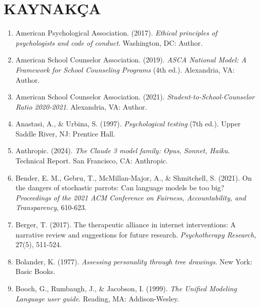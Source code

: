 
\chapter*{KAYNAKÇA}

\begin{enumerate}


\item American Psychological Association. (2017). \textit{Ethical principles of psychologists and code of conduct}. Washington, DC: Author.

\item American School Counselor Association. (2019). \textit{ASCA National Model: A Framework for School Counseling Programs} (4th ed.). Alexandria, VA: Author.

\item American School Counselor Association. (2021). \textit{Student-to-School-Counselor Ratio 2020-2021}. Alexandria, VA: Author.

\item Anastasi, A., \& Urbina, S. (1997). \textit{Psychological testing} (7th ed.). Upper Saddle River, NJ: Prentice Hall.

\item Anthropic. (2024). \textit{The Claude 3 model family: Opus, Sonnet, Haiku}. Technical Report. San Francisco, CA: Anthropic.

\item Bender, E. M., Gebru, T., McMillan-Major, A., \& Shmitchell, S. (2021). On the dangers of stochastic parrots: Can language models be too big? \textit{Proceedings of the 2021 ACM Conference on Fairness, Accountability, and Transparency}, 610-623.

\item Berger, T. (2017). The therapeutic alliance in internet interventions: A narrative review and suggestions for future research. \textit{Psychotherapy Research}, 27(5), 511-524.

\item Bolander, K. (1977). \textit{Assessing personality through tree drawings}. New York: Basic Books.

\item Booch, G., Rumbaugh, J., \& Jacobson, I. (1999). \textit{The Unified Modeling Language user guide}. Reading, MA: Addison-Wesley.


\end{enumerate}
